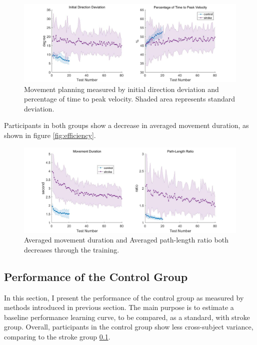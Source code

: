 \begin{figure}
	\centering
	\includegraphics[width=\linewidth]{figures/planning}
	\caption[Movement planning measured by initial direction deviation and percentage of time to peak velocity.]{Movement planning measured by initial direction deviation and percentage of time to peak velocity. Shaded area represents standard deviation.}
	\label{fig:planning}
\end{figure}

Participants in both groups show a decrease in averaged movement duration, as shown in figure \ref{fig:efficiency}.

\begin{figure}
	\centering
	\includegraphics[width=\linewidth]{figures/efficiency}
	\caption[Averaged movement duration and path-length ratio]{Averaged movement duration and Averaged path-length ratio both decreases through the training.}
	\label{fig:temporalefficiency}
\end{figure}



\subsection{Performance of the Control Group}

In this section, I present the performance of the control group as measured by methods introduced in previous section. The main purpose is to estimate a baseline performance learning curve, to be compared, as a standard, with stroke group. Overall, participants in the control group show less cross-subject variance, comparing to the stroke group \ref{}. 

